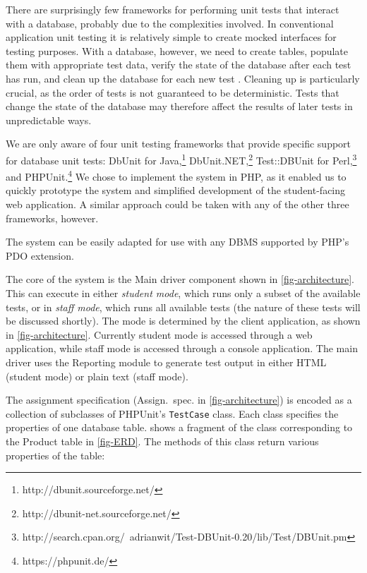 \documentclass[sigconf, authordraft, capitalise]{acmart}
\begin{document}
There are surprisingly few frameworks for performing unit tests that interact with a database, probably due to the complexities involved. In conventional application unit testing it is relatively simple to create mocked interfaces for testing purposes. With a database, however, we need to create tables, populate them with appropriate test data, verify the state of the database after each test has run, and clean up the database for each new test \cite{Bergmann.S-2017a-PHPUnit}. Cleaning up is particularly crucial, as the order of tests is not guaranteed to be deterministic. Tests that change the state of the database may therefore affect the results of later tests in unpredictable ways.

We are only aware of four unit testing frameworks that provide specific support for database unit tests: DbUnit for Java,\footnote{http://dbunit.sourceforge.net/} DbUnit.NET,\footnote{http://dbunit-net.sourceforge.net/} Test::DBUnit for Perl,\footnote{http://search.cpan.org/~adrianwit/Test-DBUnit-0.20/lib/Test/DBUnit.pm} and PHPUnit.\footnote{https://phpunit.de/} We chose to implement the system in PHP, as it enabled us to quickly prototype the system and simplified development of the student-facing web application. A similar approach could be taken with any of the other three frameworks, however.

The system can be easily adapted for use with any DBMS supported by PHP's PDO extension.

The core of the system is the \textsf{Main driver} component shown in \cref{fig-architecture}. This can execute in either \emph{student mode}, which runs only a subset of the available tests, or in \emph{staff mode}, which runs all available tests (the nature of these tests will be discussed shortly). The mode is determined by the client application, as shown in \ref{fig-architecture}. Currently student mode is accessed through a web application, while staff mode is accessed through a console application. The main driver uses the \textsf{Reporting} module to generate test output in either HTML (student mode) or plain text (staff mode).

The assignment specification (\textsf{Assign.\ spec.} in \cref{fig-architecture}) is encoded as a collection of subclasses of PHPUnit's \texttt{TestCase} class. Each class specifies the properties of one database table.  shows a fragment of the class corresponding to the \textsf{Product} table in \cref{fig-ERD}. The methods of this class return various properties of the table:
\end{document}
